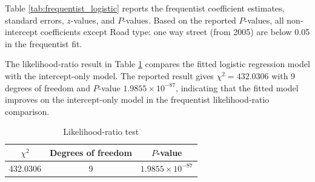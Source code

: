 Table \ref{tab:frequentist_logistic} reports the frequentist coefficient estimates, standard errors, $z$-values, and $P$-values. Based on the reported $P$-values, all non-intercept coefficients except Road type: one way street (from 2005) are below 0.05 in the frequentist fit.

\begin{table}[htbp]
\centering
\caption{Frequentist logistic regression coefficient estimates}
\label{tab:frequentist_logistic}
\scriptsize
{}
\end{table}

The likelihood-ratio result in Table \ref{tab:frequentist_lrt} compares the fitted logistic regression model with the intercept-only model. The reported result gives $\chi^2=432.0306$ with 9 degrees of freedom and $P$-value $1.9855\times 10^{-87}$, indicating that the fitted model improves on the intercept-only model in the frequentist likelihood-ratio comparison.

\begin{table}[htbp]
\centering
\caption{Likelihood-ratio test}
\label{tab:frequentist_lrt}
\begin{tabular}{ccc}
\hline
$\chi^2$ & Degrees of freedom & $P$-value \\
\hline
432.0306 & 9 & $1.9855\times 10^{-87}$ \\
\hline
\end{tabular}
\end{table}

